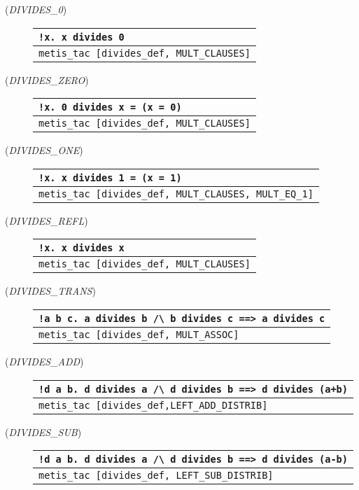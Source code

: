 \begin{description}
\label{euclid:extra-proofs}
\item [\small{({\it DIVIDES\_0\/})}]
\begin{tabular}[t]{l}
\verb+!x. x divides 0+ \\ \hline
 \verb+metis_tac [divides_def, MULT_CLAUSES]+
\end{tabular}

\item[\small{({\it DIVIDES\_ZERO\/})}]
\begin{tabular}[t]{l}
\verb+!x. 0 divides x = (x = 0)+ \\ \hline
 \verb+metis_tac [divides_def, MULT_CLAUSES]+
\end{tabular}

\item[\small{({\it DIVIDES\_ONE\/})}]
\begin{tabular}[t]{l}
\verb+!x. x divides 1 = (x = 1)+ \\ \hline
 \verb+metis_tac [divides_def, MULT_CLAUSES, MULT_EQ_1]+
\end{tabular}

\item[\small{({\it DIVIDES\_REFL\/})}]
\begin{tabular}[t]{l}
\verb+!x. x divides x+ \\ \hline
 \verb+metis_tac [divides_def, MULT_CLAUSES]+ \\
\end{tabular}

\item[\small{({\it DIVIDES\_TRANS\/})}]
\begin{tabular}[t]{l}
\verb+!a b c. a divides b /\ b divides c ==> a divides c+ \\ \hline
 \verb+metis_tac [divides_def, MULT_ASSOC]+ \\
\end{tabular}
\item[\small{({\it DIVIDES\_ADD\/})}]
\begin{tabular}[t]{l}
\verb|!d a b. d divides a /\ d divides b ==> d divides (a+b)| \\ \hline
 \verb|metis_tac [divides_def,LEFT_ADD_DISTRIB]|
\end{tabular}

\item[\small{({\it DIVIDES\_SUB\/})}]
\begin{tabular}[t]{l}
\verb+!d a b. d divides a /\ d divides b ==> d divides (a-b)+ \\ \hline
 \verb+metis_tac [divides_def, LEFT_SUB_DISTRIB]+ \\
\end{tabular}


\end{description}
